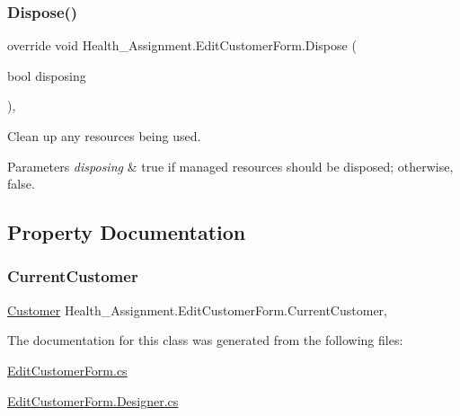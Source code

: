 \subsubsection{\texorpdfstring{Dispose()}{Dispose()}}
{\footnotesize\ttfamily override void Health\+\_\+\+Assignment.\+Edit\+Customer\+Form.\+Dispose (\begin{DoxyParamCaption}\item[{bool}]{disposing }\end{DoxyParamCaption})\hspace{0.3cm}{\ttfamily [inline]}, {\ttfamily [protected]}}



Clean up any resources being used. 


\begin{DoxyParams}{Parameters}
{\em disposing} & true if managed resources should be disposed; otherwise, false.\\
\hline
\end{DoxyParams}


\subsection{Property Documentation}
\mbox{\label{class_health___assignment_1_1_edit_customer_form_a19eda06b43bc01c10061b3406b9b7e82}} 
\subsubsection{\texorpdfstring{Current\+Customer}{CurrentCustomer}}
{\footnotesize\ttfamily \hyperlink{class_health___assignment_1_1_customer}{Customer} Health\+\_\+\+Assignment.\+Edit\+Customer\+Form.\+Current\+Customer\hspace{0.3cm}{\ttfamily [get]}, {\ttfamily [set]}}



The documentation for this class was generated from the following files\+:\begin{DoxyCompactItemize}
\item 
\hyperlink{_edit_customer_form_8cs}{Edit\+Customer\+Form.\+cs}\item 
\hyperlink{_edit_customer_form_8_designer_8cs}{Edit\+Customer\+Form.\+Designer.\+cs}\end{DoxyCompactItemize}
